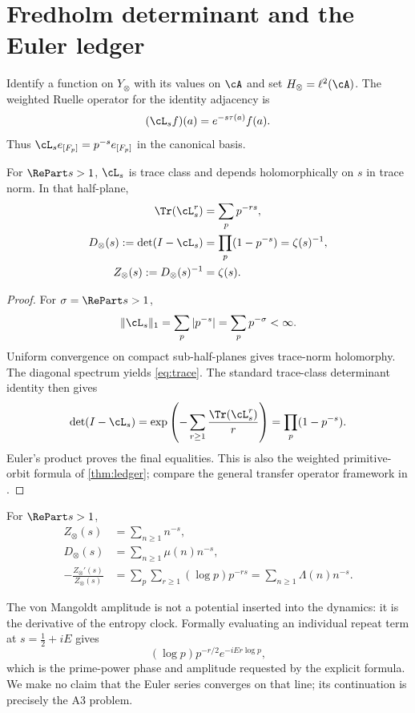 \section{Fredholm determinant and the Euler ledger}

Identify a function on $Y_\otimes$ with its values on $\cA$ and set
$H_\otimes=\ell^2(\cA)$.  The weighted Ruelle operator for the identity
adjacency is
\[
  (\cL_s f)(a)=e^{-s\tau(a)}f(a).
\]
Thus $\cL_s e_{[F_p]}=p^{-s}e_{[F_p]}$ in the canonical basis.

\begin{theorem}
\label{thm:fredholm}
For $\RePart s>1$, $\cL_s$ is trace class and depends holomorphically on $s$
in trace norm.  In that half-plane,
\begin{align}
 \Tr(\cL_s^r)&=\sum_p p^{-rs},\label{eq:trace}\\
 D_\otimes(s):=\det(I-\cL_s)&=\prod_p(1-p^{-s})=\zeta(s)^{-1},\label{eq:det}\\
 Z_\otimes(s):=D_\otimes(s)^{-1}&=\zeta(s).\label{eq:zeta}
\end{align}
\end{theorem}

\begin{proof}
For $\sigma=\RePart s>1$,
\[
 \|\cL_s\|_1=\sum_p|p^{-s}|=\sum_p p^{-\sigma}<\infty.
\]
Uniform convergence on compact sub-half-planes gives trace-norm
holomorphy.  The diagonal spectrum yields \eqref{eq:trace}.  The standard
trace-class determinant identity then gives
\[
 \det(I-\cL_s)
 =\exp\left(-\sum_{r\geq1}\frac{\Tr(\cL_s^r)}r\right)
 =\prod_p(1-p^{-s}).
\]
Euler's product proves the final equalities.  This is also the weighted
primitive-orbit formula of \cref{thm:ledger}; compare the general transfer
operator framework in \citet{ruelle2002}.
\end{proof}

\begin{corollary}
\label{cor:coefficients}
For $\RePart s>1$,
\begin{align}
 Z_\otimes(s)&=\sum_{n\geq1}n^{-s},\\
 D_\otimes(s)&=\sum_{n\geq1}\mu(n)n^{-s},\\
 -\frac{Z_\otimes'(s)}{Z_\otimes(s)}
 &=\sum_p\sum_{r\geq1}(\log p)p^{-rs}
 =\sum_{n\geq1}\Lambda(n)n^{-s}.
\end{align}
\end{corollary}

The von Mangoldt amplitude is not a potential inserted into the dynamics: it
is the derivative of the entropy clock.  Formally evaluating an individual
repeat term at $s=\tfrac12+iE$ gives
\[
 (\log p)p^{-r/2}e^{-iEr\log p},
\]
which is the prime-power phase and amplitude requested by the explicit
formula.  We make no claim that the Euler series converges on that line; its
continuation is precisely the A3 problem.

